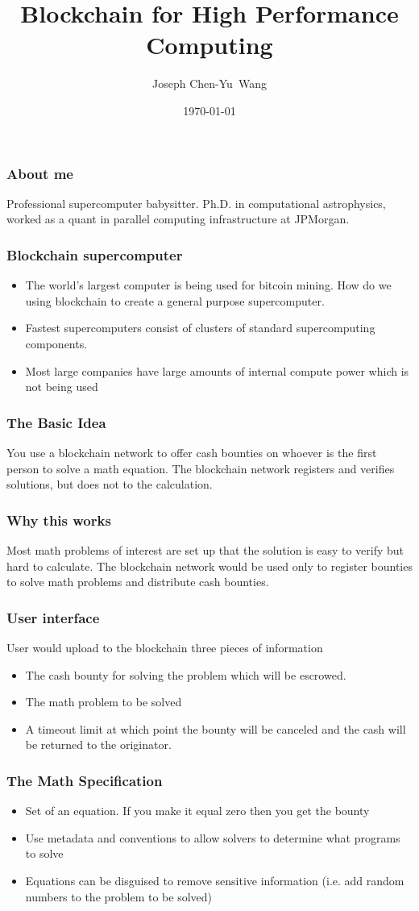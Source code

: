 \documentclass{beamer}
\title {Blockchain for High Performance Computing}
\author{Joseph Chen-Yu~Wang}
\institute{Bitquant Research Laboratories (Asia) Limited}
\date{\today}
\begin{document}
\frame{\titlepage}
\begin{frame}
  \frametitle{About me}
Professional supercomputer babysitter.  Ph.D. in computational
astrophysics, worked as a quant in parallel computing 
infrastructure at JPMorgan.
\end{frame}
\begin{frame}
  \frametitle{Blockchain supercomputer}
  \begin{itemize}
  \item The world's largest computer is being used for bitcoin mining.  How do
    we using blockchain to create a general purpose supercomputer.  
  \item Fastest supercomputers consist of clusters of standard
    supercomputing components.
  \item Most large companies have large amounts of internal compute
    power which is not being used
  \end{itemize}
\end{frame}
\begin{frame}
  \frametitle{The Basic Idea}
  You use a blockchain network to offer cash bounties on whoever is
  the first person to solve a math equation.  The blockchain network
  registers and verifies solutions, but does not to the calculation.
\end{frame}
\begin{frame}
  \frametitle{Why this works}
Most math problems of interest are set up that the solution is easy to
verify but hard to calculate.  The blockchain network would be used
only to register bounties to solve math problems and distribute cash
bounties.
\end{frame}
\begin{frame}
  \frametitle{User interface}
  User would upload to the blockchain three pieces of information
  \begin{itemize}
  \item The cash bounty for solving the problem which will be escrowed.
  \item The math problem to be solved
  \item A timeout limit at which point the bounty will be canceled
    and the cash will be returned to the originator.
  \end{itemize}
\end{frame}
\begin{frame}
  \frametitle{The Math Specification}
  \begin{itemize}
    \item Set of an equation.  If you make it equal zero then you get
      the bounty
    \item Use metadata and conventions to allow solvers to determine
      what programs to solve
    \item Equations can be disguised to remove sensitive information
      (i.e. add random numbers to the problem to be solved)
  \end{itemize}
\end{frame}
\end{document}
